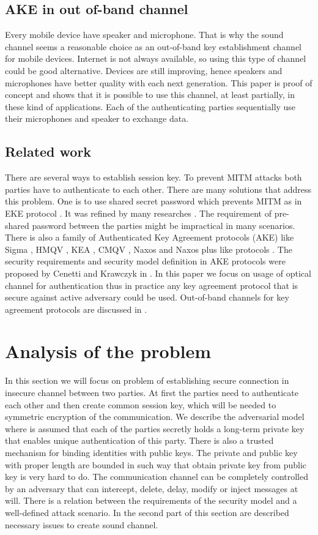 \documentclass[11pt,titlepage]{article}
\theoremstyle{plain}
\begin{document}
\subsection{AKE in out of-band channel}
Every mobile device have speaker and microphone. That is why the sound channel seems a reasonable choice as an out-of-band key establishment channel for mobile devices. Internet is not always available, so using this type of channel could be good alternative. Devices are still improving, hence speakers and microphones have better quality with each next generation. This paper is proof of concept and shows that it is possible to use this channel, at least partially, in these kind of applications. Each of the authenticating parties sequentially use their microphones and speaker to exchange data.


\subsection{Related work}
There are several ways to establish session key. To prevent MITM attacks both parties have to authenticate to each other. There are many solutions that address this problem. One is to use shared secret password which prevents MITM as in EKE protocol \cite{EKE}. It was refined by many researches \cite{EKE, EKE2}. The requirement of pre-shared password between the parties might be impractical in many scenarios. There is also a family of Authenticated Key Agreement protocols (AKE) like Sigma \cite{sign_mac}, HMQV \cite{HMQV}, KEA \cite{KEA}, CMQV \cite{CMQV}, Naxos and Naxos plus like protocols \cite{AMA, NAXOS}. The security requirements and security model definition in AKE protocols were proposed by Cenetti and Krawczyk in \cite{security_canetti_krawczyk, key_exchange}. In this paper we focus on usage of optical channel for authentication thus in practice any key agreement protocol that is secure against active adversary could be used. Out-of-band channels for key agreement protocols are discussed in \cite{chirp, sib, ad_hoc, veh, vibrat}.

\section{Analysis of the problem}

In this section we will focus on problem of establishing secure connection in insecure channel between two parties. At first the parties need to authenticate each other and then create common session key, which will be needed to symmetric encryption of the communication. We describe the adversarial model where is assumed that each of the parties secretly holds a long-term private key that enables unique authentication of this party. There is also a trusted mechanism for binding identities with public keys. The private and public key with proper length are bounded in such way that obtain private key from public key is very hard to do. The communication channel can be completely controlled by an adversary that can intercept, delete, delay, modify or inject messages at will. There is a relation between the requirements of the security model and a well-defined attack scenario. In the second part of this section are described necessary issues to create sound channel.
\end{document}
